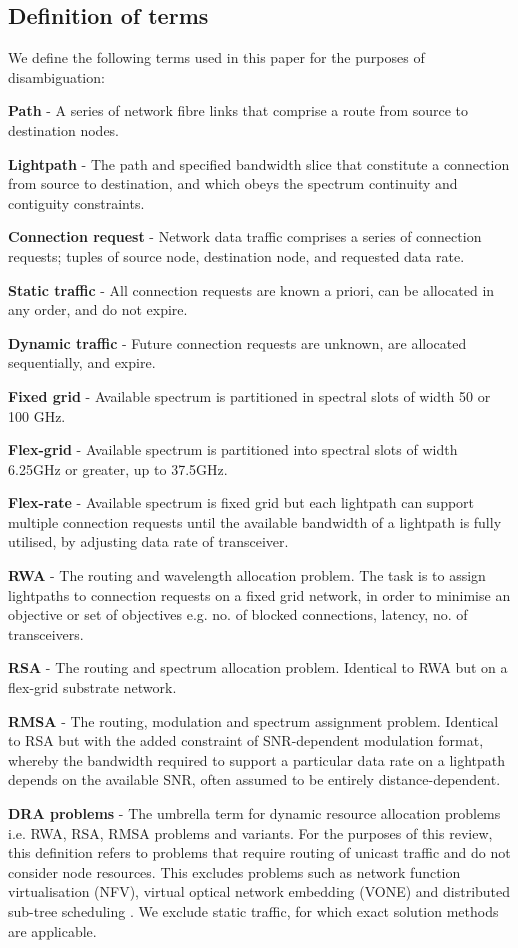 \subsection*{Definition of terms}

We define the following terms used in this paper for the purposes of disambiguation:

\textbf{Path} - A series of network fibre links that comprise a route from source to destination nodes.

\textbf{Lightpath} - The path and specified bandwidth slice that constitute a connection from source to destination, and which obeys the spectrum continuity and contiguity constraints.

\textbf{Connection request} - Network data traffic comprises a series of connection requests; tuples of source node, destination node, and requested data rate. 

\textbf{Static traffic} - All connection requests are known a priori, can be allocated in any order, and do not expire.

\textbf{Dynamic traffic} - Future connection requests are unknown, are allocated sequentially, and expire.

\textbf{Fixed grid} - Available spectrum is partitioned in spectral slots of width 50 or 100 GHz.

\textbf{Flex-grid} - Available spectrum is partitioned into spectral slots of width 6.25GHz or greater, up to 37.5GHz.

\textbf{Flex-rate} - Available spectrum is fixed grid but each lightpath can support multiple connection requests until the available bandwidth of a lightpath is fully utilised, by adjusting data rate of transceiver.

\textbf{RWA} - The routing and wavelength allocation problem. The task is to assign lightpaths to connection requests on a fixed grid network, in order to minimise an objective or set of objectives e.g. no. of blocked connections, latency, no. of transceivers.

\textbf{RSA} - The routing and spectrum allocation problem. Identical to RWA but on a flex-grid substrate network.

\textbf{RMSA} - The routing, modulation and spectrum assignment problem. Identical to RSA but with the added constraint of SNR-dependent modulation format, whereby the bandwidth required to support a particular data rate on a lightpath depends on the available SNR, often assumed to be entirely distance-dependent. 

\textbf{DRA problems} - The umbrella term for dynamic resource allocation problems i.e. RWA, RSA, RMSA problems and variants. For the purposes of this review, this definition refers to problems that require routing of unicast traffic and do not consider node resources. This excludes problems such as network function virtualisation (NFV), virtual optical network embedding (VONE) and distributed sub-tree scheduling \cite{li_tabdeep_2024}. We exclude static traffic, for which exact solution methods are applicable.